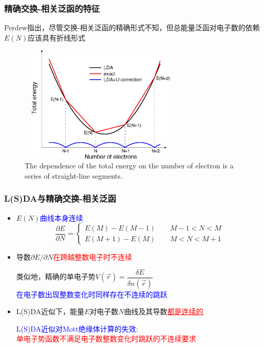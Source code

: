 \frame
{
	\frametitle{精确交换-相关泛函的特征}
	\textrm{Perdew}指出，尽管交换-相关泛函的精确形式不知，但总能量泛函对电子数的依赖$E(N)$应该具有折线形式
\begin{figure}[h!]
\centering
\vspace*{-0.1in}
\includegraphics[height=2.2in,width=3.1in,viewport=0 0 1200 890,clip]{Figures/Koopmans-condition_LDA-U.png}
\caption{\tiny \textrm{The dependence of the total energy on the number of electron is a series of straight-line segments.}}%
\label{exact-DFT}
\end{figure}
}

\frame
{
	\frametitle{\textrm{L(S)DA}与精确交换-相关泛函}
	\begin{itemize}
		\item $E(N)$\textcolor{blue}{曲线本身连续}
	\begin{displaymath}
		\dfrac{\partial E}{\partial N}=\left\{
		\begin{aligned}
			E(M)-E(M-1)\qquad M-1<N<M\\
			E(M+1)-E(M)\qquad M<N<M+1 
		\end{aligned}\right.
	\end{displaymath}
		\item 导数$\partial E/\partial N$\textcolor{red}{在跨越整数电子时不连续}

	类似地，精确的单电子势$V(\vec r)=\dfrac{\delta E}{\delta n(\vec r)}$\\
	\textcolor{blue}{在电子数出现整数变化时同样存在不连续的跳跃}
		\item \textrm{L(S)DA}近似下，能量$E$对电子数$N$曲线及其导数\textcolor{red}{\underline{都是连续的}}
	
			\vspace{10pt}
	\textcolor{blue}{\textrm{L(S)DA}近似对\textrm{Mott}绝缘体计算的失效}:\\
	\textcolor{red}{单电子势函数不满足电子数整数变化时跳跃的不连续要求}
	\end{itemize}
}

